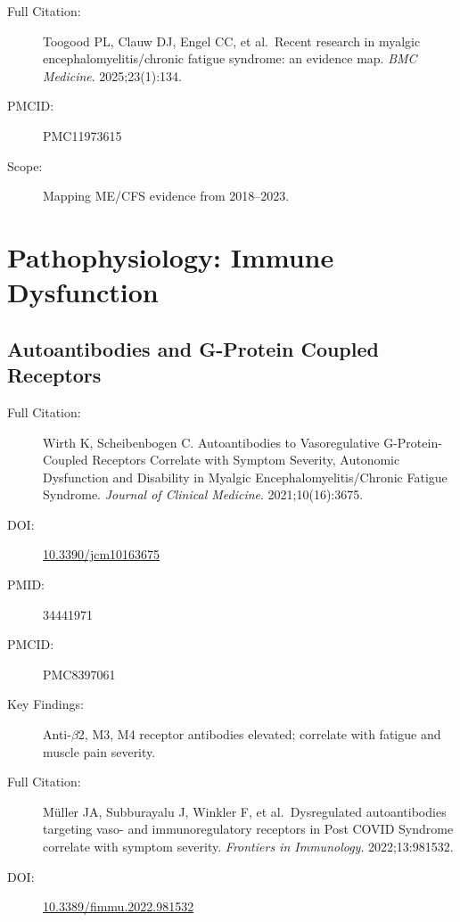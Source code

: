 \begin{description}
    \item[Full Citation:] Toogood PL, Clauw DJ, Engel CC, et al.\ Recent research in myalgic encephalomyelitis/chronic fatigue syndrome: an evidence map. \textit{BMC Medicine}. 2025;23(1):134.
    \item[PMCID:] PMC11973615
    \item[Scope:] Mapping ME/CFS evidence from 2018--2023.
\end{description}

\section{Pathophysiology: Immune Dysfunction}
\label{sec:bib-immune-dysfunction}

\subsection{Autoantibodies and G-Protein Coupled Receptors}

\begin{description}
    \item[Full Citation:] Wirth K, Scheibenbogen C. Autoantibodies to Vasoregulative G-Protein-Coupled Receptors Correlate with Symptom Severity, Autonomic Dysfunction and Disability in Myalgic Encephalomyelitis/Chronic Fatigue Syndrome. \textit{Journal of Clinical Medicine}. 2021;10(16):3675.
    \item[DOI:] \href{https://doi.org/10.3390/jcm10163675}{10.3390/jcm10163675}
    \item[PMID:] 34441971
    \item[PMCID:] PMC8397061
    \item[Key Findings:] Anti-$\beta$2, M3, M4 receptor antibodies elevated; correlate with fatigue and muscle pain severity.
\end{description}

\begin{description}
    \item[Full Citation:] M\"uller JA, Subburayalu J, Winkler F, et al.\ Dysregulated autoantibodies targeting vaso- and immunoregulatory receptors in Post COVID Syndrome correlate with symptom severity. \textit{Frontiers in Immunology}. 2022;13:981532.
    \item[DOI:] \href{https://doi.org/10.3389/fimmu.2022.981532}{10.3389/fimmu.2022.981532}
\end{description}

